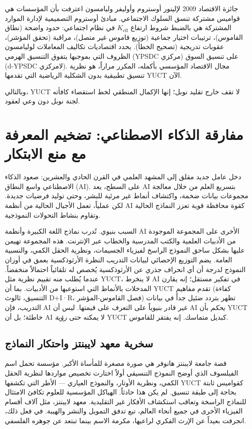 \documentclass[12pt,a4paper]{article}
\begin{document}
	جائزة الاقتصاد 2009 لإلينور أوستروم وأوليفر وليامسون اعترفت بأن المؤسسات هي قواميس مشتركة تنسق السلوك الاجتماعي. مبادئ أوستروم التصميمية لإدارة الموارد المشتركة هي بالضبط شروط ارتفاع \(K_{\mathrm{eff}}\) في نظام اجتماعي: حدود واضحة (نطاق القاموس)، ترتيبات اختيار جماعية (توزيع قاموس غير متصل)، مراقبة (تحقق المؤشر)، عقوبات تدريجية (تصحيح الخطأ). يحدد اقتصاديات تكاليف المعاملات لوليامسون الظروف التي بموجبها يتفوق التنسيق الهرمي (YPSDC مركزي) على تنسيق السوق (d-YPSDC لامركزي). مجال الاقتصاد المؤسسي بأكمله، المكرر مراراً، هو نظرية تنسيق تطبيقية بدون الشكلية الرياضية التي تقدمها YUCT الآن.
	
	وبالتالي، YUCT لا تقف خارج تقليد نوبل؛ إنها الإكمال المنطقي لخط استقصاء كافأته لجنة نوبل دون وعي لعقود.
	
	\section{مفارقة الذكاء الاصطناعي: تضخيم المعرفة مع منع الابتكار}
	
	دخل عامل جديد مقلق إلى المشهد العلمي في القرن الحادي والعشرين: صعود الذكاء الاصطناعي واسع النطاق (AI). على السطح، يعد AI بتسريع العلم من خلال معالجة مجموعات بيانات ضخمة، واكتشاف أنماط غير مرئية للبشر، وحتى توليد فرضيات جديدة. لكن عملياً، تعمل الأجيال الحالية من أنظمة AI كقوة محافظة قوية تعزز النماذج الحالية وتقاوم بنشاط التحولات النموذجية.
	
	السبب بنيوي. تُدرب نماذج اللغة الكبيرة وأنظمة AI الأخرى على المجموعة الموجودة من الأدبيات العلمية والكتب المدرسية والخطاب عبر الإنترنت. هذه المجموعة تهيمن عليها بشكل ساحق النموذج الراسخ لفيزياء الجسيمات، ونظرية الحقل الكمي، والنسبية العامة. يضم التوزيع الإحصائي لبيانات التدريب النظرة الأرثوذكسية بعمق في أوزان النموذج لدرجة أن أي انحراف جذري عن الأرثوذكسية يُخصص له تلقائياً احتمالاً منخفضاً. عندما يُطلب منه تقييم نظرية مثل YUCT، لا ينخرط AI في تفكير مستقل؛ إنه يقارن المدخلات بالأنماط التي استوعبها من الأدبيات. بما أن YUCT تقدم مفاهيم (كفاءة التنسيق، ثالوث D+I·R، فصل القاموس-المؤشر) تظهر بتردد ضئيل جداً في بيانات التدريب، فإن AI غير قادر بنيوياً على التعرف على قيمتها. ليس أن AI \emph{يحكم} بأن YUCT خاطئة؛ بل أن AI لا يمكنه حتى \emph{رؤية} YUCT كبديل متماسك. إنه يفتقر للقاموس.
	
	\subsection{سخرية معهد لايبنتز واحتكار النماذج}
	
	قصة جامعة لايبنتز هانوفر هي صورة مصغرة للمأساة الأكبر. مؤسسة تحمل اسم الفيلسوف الذي أوضح النموذج التنسيقي أولاً اختارت تخصيص مواردها لنظرية الحقل الكمي، ونظرية الأوتار، والنموذج العياري — الأطر التي تكشفها YUCT كقواميس ثابتة بحاجة إلى طبقة تنسيق. لم يكن هذا حادثاً. الهياكل المؤسسية للعلوم تكافئ الامتثال للنماذج الراسخة وتعاقب استكشاف الأفكار غير التقليدية. معهد لايبنتز، مثل آلاف أقسام الفيزياء الأخرى في جميع أنحاء العالم، تبع تدفق التمويل والنشر والهيبة. في فعل ذلك، انجرفت بعيداً عن الإرث الفكري لراعيها، مكرمة الاسم بينما تبتعد عن جوهره الفلسفي.
	
\end{document}
